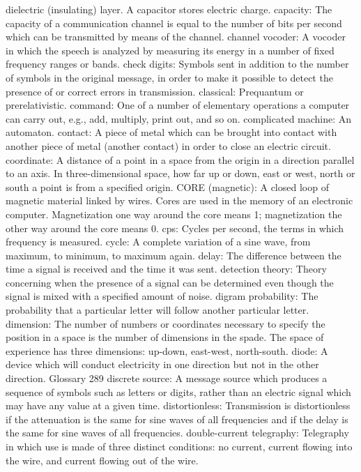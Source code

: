 {{{{{{{{{{{{{{{dielectric (insulating) layer. A capacitor stores electric charge.
capacity: The capacity of a communication channel is equal to the
number of bits per second which can be transmitted by means of
the channel.
channel vocoder: A vocoder in which the speech is analyzed by measuring
its energy in a number of fixed frequency ranges or bands.
check digits: Symbols sent in addition to the number of symbols in the
original message, in order to make it possible to detect the presence
of or correct errors in transmission.
classical: Prequantum or prerelativistic.
command: One of a number of elementary operations a computer can
carry out, e.g., add, multiply, print out, and so on.
complicated machine: An automaton.
contact: A piece of metal which can be brought into contact with another
piece of metal (another contact) in order to close an electric circuit.
coordinate: A distance of a point in a space from the origin in a direction
parallel to an axis. In three-dimensional space, how far up or down,
east or west, north or south a point is from a specified origin.
CORE (magnetic): A closed loop of magnetic material linked by wires.
Cores are used in the memory of an electronic computer. Magnetization
one way around the core means 1; magnetization the other
way around the core means 0.
cps: Cycles per second, the terms in which frequency is measured.
cycle: A complete variation of a sine wave, from maximum, to minimum,
to maximum again.
delay: The difference between the time a signal is received and the time
it was sent.
detection theory: Theory concerning when the presence of a signal can
be determined even though the signal is mixed with a specified
amount of noise.
digram probability: The probability that a particular letter will follow
another particular letter.
dimension: The number of numbers or coordinates necessary to specify
the position in a space is the number of dimensions in the spade.
The space of experience has three dimensions: up-down, east-west,
north-south.
diode: A device which will conduct electricity in one direction but not in
the other direction.
Glossary 289
discrete source: A message source which produces a sequence of symbols
such as letters or digits, rather than an electric signal which may
have any value at a given time.
distortionless: Transmission is distortionless if the attenuation is the
same for sine waves of all frequencies and if the delay is the same
for sine waves of all frequencies.
double-current telegraphy: Telegraphy in which use is made of three
distinct conditions: no current, current flowing into the wire, and
current flowing out of the wire.
}}}}}}}}}}}}}}}
